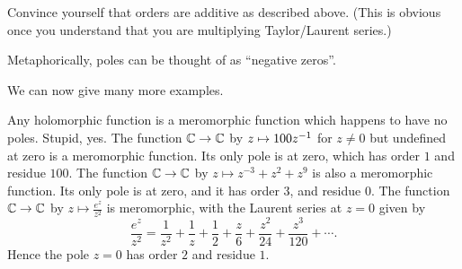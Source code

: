 \begin{exercise}
	Convince yourself that orders are additive as described above.
	(This is obvious once you understand that you
	are multiplying Taylor/Laurent series.)
\end{exercise}

Metaphorically, poles can be thought of as ``negative zeros''.


We can now give many more examples.
\begin{example}
	\listhack
	\begin{enumerate}[(a)]
		\ii Any holomorphic function is a meromorphic function which happens to have no poles.
		Stupid, yes.
		\ii The function $\mathbb C \to \mathbb C$ by $z \mapsto 100z^{-1}$ for $z \neq 0$
		but undefined at zero is a meromorphic function.
		Its only pole is at zero, which has order $1$ and residue $100$.
		\ii The function $\mathbb C \to \mathbb C$ by $z \mapsto z^{-3} + z^2 + z^9$ is also a meromorphic function.
		Its only pole is at zero, and it has order $3$, and residue $0$.
		\ii The function $\mathbb C \to \mathbb C$ by $z \mapsto \frac{e^z}{z^2}$ is meromorphic,
		with the Laurent series at $z=0$ given by
		\[
			\frac{e^z}{z^2}
			= \frac{1}{z^2} + \frac{1}{z} + \frac{1}{2} + \frac{z}{6} + \frac{z^2}{24} + \frac{z^3}{120}
			+ \dotsb.
		\]
		Hence the pole $z=0$ has order $2$ and residue $1$.
	\end{enumerate}
\end{example}

